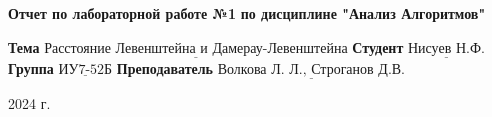 \begin{titlepage}
	
	\begin{center}
		\noindent\begin{minipage}{1.3\textwidth}\centering
		\Large\textbf{   Отчет по лабораторной работе №1}\newline
		\textbf{по дисциплине "Анализ Алгоритмов"}\newline\newline\newline
		\end{minipage}
	\end{center}
	
	\noindent\textbf{Тема} 			$\underline{\text{Расстояние Левенштейна и Дамерау-Левенштейна}}$\newline\newline
	\noindent\textbf{Студент} 		$\underline{\text{Нисуев Н.Ф.}}$\newline\newline
	\noindent\textbf{Группа} 		$\underline{\text{ИУ7-52Б}}$\newline\newline
	\noindent\textbf{Преподаватель} $\underline{\text{Волкова Л. Л., Строганов Д.В.}}$\newline
	
	\begin{center}
        \vfill
		2024 г.
	\end{center}
	\restoregeometry
\end{titlepage}